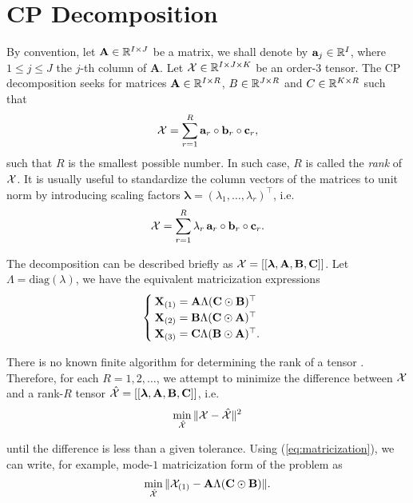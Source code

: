 \section{CP Decomposition}
By convention, let $\mathbf{A}\in{\mathbb{R}}^{I\times J}$ be a matrix, we shall denote by $\mathbf{a}_j \in {\mathbb{R}}^{I}$, where $1\le j \le J$ the $j$-th column of $\mathbf{A}$. Let $\mathcal{X}\in{\mathbb{R}}^{I\times J\times K}$ be an order-3 tensor. The CP decomposition seeks for matrices $\mathbf{A}\in{\mathbb{R}}^{I\times R}$, $B\in{\mathbb{R}}^{J\times R}$ and $C\in{\mathbb{R}}^{K\times R}$ such that
\begin{equation}
    \mathcal{X} = \sum\limits_{r=1}^{R} \mathbf{a}_r\circ \mathbf{b}_r \circ \mathbf{c}_r,
\end{equation}
such that $R$ is the smallest possible number. In such case, $R$ is called the \textit{rank} of $\mathcal{X}$. It is usually useful to standardize the column vectors of the matrices to unit norm by introducing scaling factors $\bm{\lambda} = (\lambda_1,\ldots,\lambda_r)^\top$, i.e.
\begin{equation}
    \mathcal{X} = \sum\limits_{r=1}^{R} \lambda_r\,\mathbf{a}_r\circ \mathbf{b}_r \circ \mathbf{c}_r.
\end{equation}

The decomposition can be described briefly as $\mathcal{X}=[[\bm{\lambda}, \mathbf{A}, \mathbf{B}, \mathbf{C}]]$. Let $\Lambda = \mathrm{diag}(\lambda)$, we have the equivalent matricization expressions
\begin{equation}
    \label{eq:matricization}
    \begin{cases}
        \mathbf{X}_{(1)} = \mathbf{A}\Lambda(\mathbf{C}\odot \mathbf{B})^\top \\
        \mathbf{X}_{(2)} = \mathbf{B}\Lambda(\mathbf{C}\odot \mathbf{A})^\top       \\
        \mathbf{X}_{(3)} = \mathbf{C}\Lambda(\mathbf{B}\odot \mathbf{A})^\top.
    \end{cases}
\end{equation}

There is no known finite algorithm for determining the rank of a tensor \cite{kruskal1989rank}. Therefore, for each $R=1,2,\ldots$, we attempt to minimize the difference between $\mathcal{X}$ and a rank-$R$ tensor $\hat{\mathcal{X}}=[[\bm{\lambda}, \mathbf{A}, \mathbf{B}, \mathbf{C}]]$, i.e.
\begin{equation}
    \min\limits_{\hat{\mathcal{X}}}\|\mathcal{X}-\hat{\mathcal{X}}\|^2
\end{equation}

until the difference is less than a given tolerance. Using (\ref{eq:matricization}), we can write, for example, mode-$1$ matricization form of the problem as
\begin{equation}
    \min\limits_{\hat{\mathcal{X}}}\|\mathcal{X}_{(1)} - \mathbf{A}\Lambda(\mathbf{C}\odot \mathbf{B})\|.
\end{equation}


